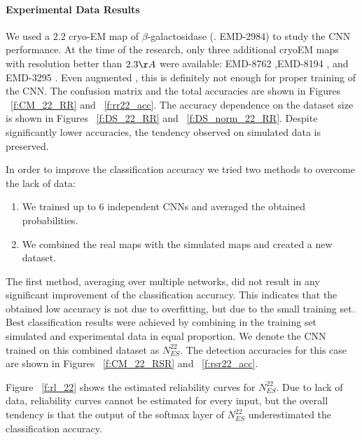 \paragraph{Experimental Data Results}
We used a $2.2$ cryo-EM map of $\beta$-galactosidase (\cite[]{Bartesaghi20152.2Inhibitor}. EMD-2984) to study the CNN performance.
At the time of the research, only three additional cryoEM maps with resolution better than $2.3 \AA$ were available: EMD-8762 \cite[]{Dong2017Antibody-inducedB14},EMD-8194 \cite[]{Merk2016BreakingDiscovery}, and EMD-3295 \cite[]{Banerjee20162.3Inhibition}.
Even augmented , this is definitely not enough for proper training of the CNN.
The confusion matrix and the total accuracies are shown in Figures ~\ref{f:CM_22_RR} and ~\ref{f:rr22_acc}.
The accuracy dependence on the dataset size is shown in Figures ~\ref{f:DS_22_RR} and ~\ref{f:DS_norm_22_RR}.
Despite significantly lower accuracies, the tendency observed on simulated data is preserved.

In order to improve the classification accuracy we tried two methods to overcome the lack of data:
\begin{enumerate}
\item We trained up to 6 independent CNNs and averaged the obtained probabilities.
\item We combined the real maps with the simulated maps and created  a new dataset.
\end{enumerate}
The first method, averaging over multiple networks, did not result in any significant improvement of the classification accuracy.
This indicates that the obtained low accuracy is not due to overfitting, but due to the small training set.
Best classification results were achieved by combining in the training set simulated and experimental data in equal proportion.
We denote the CNN trained on this combined dataset as $N^{22}_{ES}$.
The detection accuracies for this case are shown in Figures ~\ref{f:CM_22_RSR} and ~\ref{f:rsr22_acc}.

Figure ~\ref{f:rl_22} shows the estimated reliability curves for $N^{22}_{ES}$. 
Due to lack of data, reliability curves cannot be estimated for every input, but the overall tendency is that the output of the softmax layer of $N^{22}_{ES}$ underestimated the classification accuracy.

